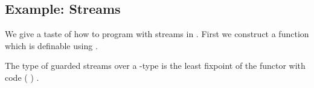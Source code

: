 \subsection{Example: Streams}
We give a taste of how to program with streams in \GTT. First we construct a function  which is definable using .
\begin{code}%
\>[0]\AgdaSpace{}%
\AgdaSymbol{:}\AgdaSpace{}%
\AgdaSpace{}%
\AgdaSymbol{\{}\AgdaSymbol{\}}\AgdaSpace{}%
\AgdaSymbol{\{}\AgdaSpace{}%
\AgdaSymbol{:}\AgdaSpace{}%
\AgdaSpace{}%
\AgdaSymbol{\}}\AgdaSpace{}%
\AgdaSymbol{(}\AgdaSpace{}%
\AgdaSymbol{:}\AgdaSpace{}%
\AgdaSpace{}%
\AgdaSymbol{)}\AgdaSpace{}%
\AgdaSpace{}%
\AgdaSpace{}%
\AgdaSpace{}%
\AgdaSymbol{(}\AgdaSpace{}%
\AgdaSymbol{)}\AgdaSpace{}%
\AgdaSpace{}%
\AgdaSpace{}%
\AgdaSpace{}%
\AgdaSymbol{(}\AgdaSpace{}%
\AgdaSpace{}%
\AgdaSymbol{(}\AgdaSpace{}%
\AgdaSymbol{))}\<%
\end{code}
The type of guarded streams over a -type  is the least fixpoint of the functor with code  ( )  .

